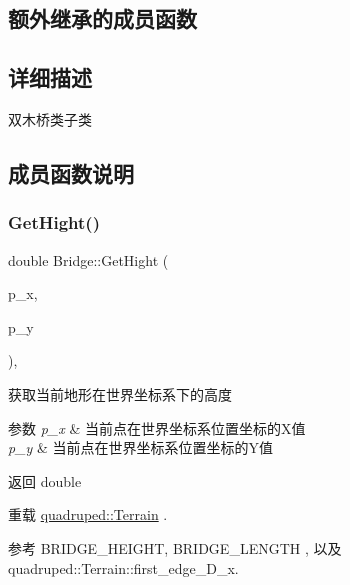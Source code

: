 \subsection*{额外继承的成员函数}


\subsection{详细描述}
双木桥类子类 

\subsection{成员函数说明}
\mbox{\label{classquadruped_1_1Bridge_a6253ac813ba0f6032e31f1ed183014be}} 
\subsubsection{\texorpdfstring{Get\+Hight()}{GetHight()}}
{\footnotesize\ttfamily double Bridge\+::\+Get\+Hight (\begin{DoxyParamCaption}\item[{double}]{p\+\_\+x,  }\item[{double}]{p\+\_\+y }\end{DoxyParamCaption})\hspace{0.3cm}{\ttfamily [override]}, {\ttfamily [virtual]}}



获取当前地形在世界坐标系下的高度 


\begin{DoxyParams}{参数}
{\em p\+\_\+x} & 当前点在世界坐标系位置坐标的\+X值 \\
\hline
{\em p\+\_\+y} & 当前点在世界坐标系位置坐标的\+Y值 \\
\hline
\end{DoxyParams}
\begin{DoxyReturn}{返回}
double 
\end{DoxyReturn}


重载 \hyperlink{classquadruped_1_1Terrain}{quadruped\+::\+Terrain} .



参考 B\+R\+I\+D\+G\+E\+\_\+\+H\+E\+I\+G\+HT, B\+R\+I\+D\+G\+E\+\_\+\+L\+E\+N\+G\+TH , 以及 quadruped\+::\+Terrain\+::first\+\_\+edge\+\_\+\+D\+\_\+x.

\mbox{\label{classquadruped_1_1Bridge_a545f85d2f11aa32b6341e32a39b6d1bf}} 
